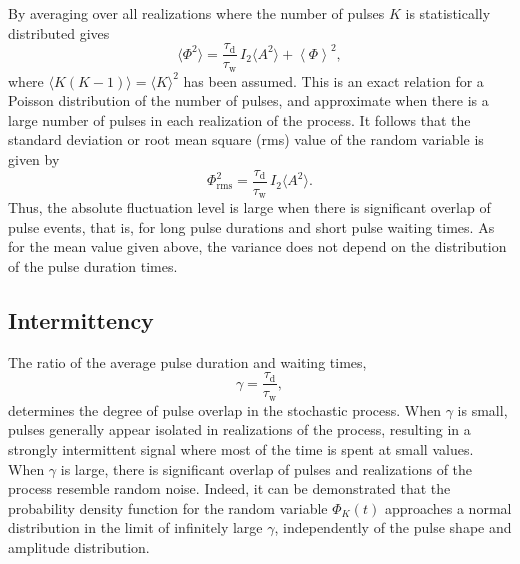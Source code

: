 \documentclass[aps,prb,12pt,a4paper,preprint,amsmath,amssymb,groupedaddress]{revtex4-1}
\newcommand{\ave}[1]{{\left<#1\right>}}
\newcommand{\taud}{\ensuremath{\tau_\text{d}}}
\newcommand{\tauw}{\ensuremath{\tau_\text{w}}}
\newcommand{\Phiave}{\ensuremath{\ave{\Phi}}}
\newcommand{\Phirms}{\ensuremath{\Phi}_\text{rms}}
\begin{document}
By averaging over all realizations where the number of pulses $K$ is statistically distributed gives
\begin{equation}
\langle{\Phi^2}\rangle = \frac{\taud}{\tauw}\,I_2\langle{A^2}\rangle + \Phiave^2 ,
\end{equation}
where $\langle{K(K-1)}\rangle=\langle{K}\rangle^2$ has been assumed. This is an exact relation for a Poisson distribution of the number of pulses, and approximate when there is a large number of pulses in each realization of the process. It follows that the standard deviation or root mean square (rms) value of the random variable is given by
\begin{equation} \label{phivariance}
\Phirms^2 = \frac{\taud}{\tauw}\,I_2\langle{A^2}\rangle .
\end{equation}
Thus, the absolute fluctuation level is large when there is significant overlap of pulse events, that is, for long pulse durations and short pulse waiting times. As for the mean value given above, the variance does not depend on the distribution of the pulse duration times.



\subsection{Intermittency}



The ratio of the average pulse duration and waiting times,
\begin{equation}
\gamma = \frac{\taud}{\tauw} ,
\end{equation}
determines the degree of pulse overlap in the stochastic process. When $\gamma$ is small, pulses generally appear isolated in realizations of the process, resulting in a strongly intermittent signal where most of the time is spent at small values. When $\gamma$ is large, there is significant overlap of pulses and realizations of the process resemble random noise. Indeed, it can be demonstrated that the probability density function for the random variable $\Phi_K(t)$ approaches a normal distribution in the limit of infinitely large $\gamma$, independently of the pulse shape and amplitude distribution.\cite{garcia-prl,garcia-php}
\end{document}
